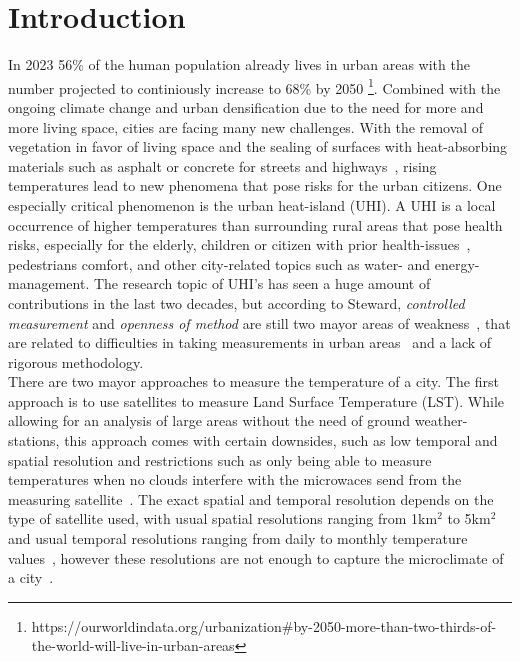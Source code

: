 
\chapter{Introduction}
\label{chap:Introduction}

In 2023 56\% of the human population already lives in urban areas with the number projected to continiously increase to 68\% by 2050 \footnote{https://ourworldindata.org/urbanization\#by-2050-more-than-two-thirds-of-the-world-will-live-in-urban-areas}. Combined with the ongoing climate change and urban densification due to the need for more and more living space, cities are facing many new challenges. With the removal of vegetation in favor of living space and the sealing of surfaces with heat-absorbing materials such as asphalt or concrete for streets and highways~\cite{gret2020urban}, rising temperatures lead to new phenomena that pose risks for the urban citizens. One especially critical phenomenon is the urban heat-island (UHI). A UHI is a local occurrence of higher temperatures than surrounding rural areas that pose health risks, especially for the elderly, children or citizen with prior health-issues~\cite{martin2015alternative}, pedestrians comfort, and other city-related topics such as water- and energy-management. The research topic of UHI's has seen a huge amount of contributions in the last two decades, but according to Steward, \textit{controlled measurement} and \textit{openness of method} are still two mayor areas of weakness~\cite{stewart2011systematic}, that are related to difficulties in taking measurements in urban areas~\cite{oke2006guideline} and a lack of rigorous methodology.\\
There are two mayor approaches to measure the temperature of a city. The first approach is to use satellites to measure Land Surface Temperature (LST). While allowing for an analysis of large areas without the need of ground weather-stations, this approach comes with certain downsides, such as low temporal and spatial resolution and restrictions such as only being able to measure temperatures when no clouds interfere with the microwaces send from the measuring satellite~\cite{zhang2015estimation}. The exact spatial and temporal resolution depends on the type of satellite used, with usual spatial resolutions ranging from 1km$^2$ to 5km$^2$ and usual temporal resolutions ranging from daily to monthly temperature values~\cite{ghent2022esalst}, however these resolutions are not enough to capture the microclimate of a city~\cite{voelkel2017towards}.\\
